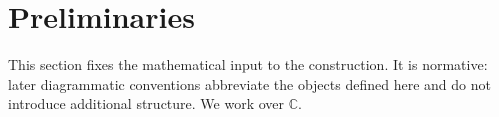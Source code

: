 \section{Preliminaries}
\label{sec:preliminaries}

This section fixes the mathematical input to the construction.  It is
normative: later diagrammatic conventions abbreviate the objects defined
here and do not introduce additional structure.  We work over $\mathbb C$.



